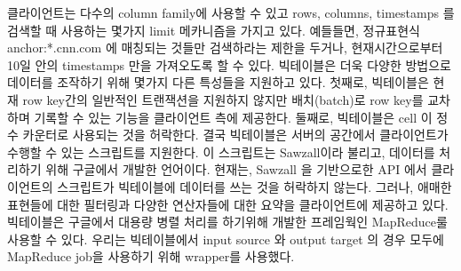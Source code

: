 \documentclass[twocolumn]{article}
\begin{document}
클라이언트는 다수의 column family에 사용할 수 있고 rows, columns, timestamps 를 검색할 때 사용하는 몇가지 limit 메카니즘을 가지고 있다. 예들들면, 정규표현식 anchor:*.cnn.com 에 매칭되는 것들만 검색하라는 제한을 두거나, 현재시간으로부터 10일 안의 timestamps 만을 가져오도록 할 수 있다.
빅테이블은 더욱 다양한 방법으로 데이터를 조작하기 위해 몇가지 다른 특성들을 지원하고 있다. 첫째로, 빅테이블은 현재 row key간의 일반적인 트랜잭션을 지원하지 않지만 배치(batch)로 row key를 교차하며 기록할 수 있는 기능을 클라이언트 측에 제공한다. 둘째로, 빅테이블은 cell 이 정수 카운터로 사용되는 것을 허락한다. 결국 빅테이블은 서버의 공간에서 클라이언트가 수행할 수 있는 스크립트를 지원한다. 이 스크립트는 Sawzall이라 불리고, 데이터를 처리하기 위해 구글에서 개발한 언어이다. 현재는, Sawzall 을 기반으로한 API 에서 클라이언트의 스크립트가 빅테이블에 데이터를 쓰는 것을 허락하지 않는다. 그러나, 애매한 표현들에 대한 필터링과 다양한 연산자들에 대한 요약을 클라이언트에 제공하고 있다.
 빅테이블은 구글에서 대용량 병렬 처리를 하기위해 개발한 프레임웍인 MapReduce룰 사용할 수 있다. 우리는 빅테이블에서 input source 와 output target 의 경우 모두에 MapReduce job을 사용하기 위해 wrapper를 사용했다.
 
\end{document}
